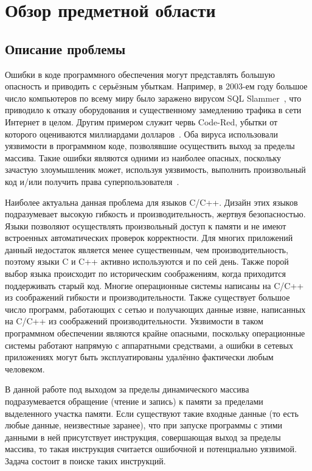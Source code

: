 \chapter{Обзор предметной области}

\section{Описание проблемы}

Ошибки в коде программного обеспечения могут представлять большую
опасность и приводить с серьёзным убыткам. Например, в 2003-ем году
большое число компьютеров по всему миру было заражено вирусом SQL
Slammer~\cite{moore2003spread}, что приводило к отказу оборудования и
существенному замедлению трафика в сети Интернет в целом. Другим
примером служит червь Code-Red, убытки от которого оцениваются
миллиардами долларов~\cite{moore2002code}. Оба вируса использовали
уязвимости в программном коде, позволявшие осуществить выход за
пределы массива. Такие ошибки являются одними из наиболее опасных,
поскольку зачастую злоумышленик может, используя уязвимость, выполнить
произвольный код и/или получить права
суперпользователя~\cite{onesmashing}.

Наиболее актуальна данная проблема для языков C/C++. Дизайн этих
языков подразумевает высокую гибкость и производительность, жертвуя
безопасностью. Языки позволяют осуществлять произвольный доступ к
памяти и не имеют встроенных автоматических проверок корректности. Для
многих приложений данный недостаток является менее существенным, чем
производительность, поэтому языки C и C++ активно используются и по
сей день. Также порой выбор языка происходит по историческим
соображениям, когда приходится поддерживать старый код. Многие
операционные системы написаны на C/C++ из соображений гибкости и
производительности. Также существует большое число программ,
работающих с сетью и получающих данные извне, написанных на C/C++ из
соображений производительности. Уязвимости в таком программном
обеспечении являются крайне опасными, поскольку операционные системы
работают напрямую с аппаратными средствами, а ошибки в сетевых
приложениях могут быть эксплуатированы удалённо фактически любым
человеком.

В данной работе под выходом за пределы динамического массива
подразумевается обращение (чтение и запись) к памяти за пределами
выделенного участка памяти. Если существуют такие входные данные (то
есть любые данные, неизвестные заранее), что при запуске программы с
этими данными в ней присутствует инструкция, совершающая
выход за пределы массива, то такая инструкция считается ошибочной и
потенциально уязвимой. Задача состоит в поиске таких инструкций.

